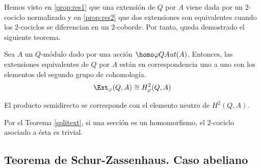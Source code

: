 Hemos visto en \ref{prop:res1} que una extensión de $Q$ por $A$ viene dada por un $2$-cociclo normalizado y en \ref{prop:res2} que dos extensiones son equivalentes cuando los $2$-cociclos se diferencian en un $2$-coborde. Por tanto, queda demostrado el siguiente teorema.

\begin{teorema}\label{h2}
	Sea $A$ un $Q$-módulo dado por una acción $\homo \varphi Q {Aut(A)}$. Entonces, las extensiones equivalentes de $Q$ por $A$ están en correspondencia uno a uno con los elementos del segundo grupo de cohomología.
	\begin{equation*}
		\Ext_{\varphi}(Q,A)\cong H^2_{\varphi}(Q,A)
	\end{equation*}
\end{teorema}

\begin{observacion}\label{obs:split}
	El producto semidirecto se corresponde con el elemento neutro de $H^2(Q,A)$.
	\begin{demostracion}
		Por el Teorema \ref{splitext}, si una sección es un homomorfismo, el $2$-cociclo asociado a ésta es trivial.
	\end{demostracion}
\end{observacion}



\subsection{Teorema de Schur-Zassenhaus. Caso abeliano}

